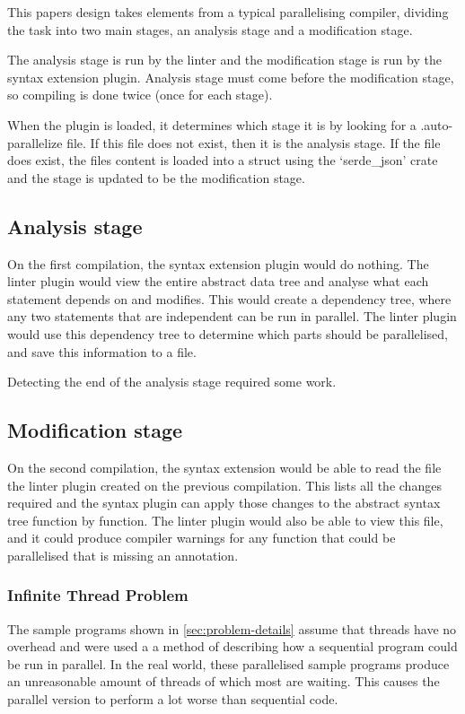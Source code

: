 \documentclass[conference]{IEEEtran}
\begin{document}
This papers design takes elements from a typical parallelising compiler, dividing the task into two main stages, an analysis stage and a modification stage.


The analysis stage is run by the linter and the modification stage is run by the syntax extension plugin. Analysis stage must come before the modification stage, so compiling is done twice (once for each stage).

When the plugin is loaded, it determines which stage it is by looking for a .auto-parallelize file. If this file does not exist, then it is the analysis stage. If the file does exist, the files content is loaded into a struct using the `serde\_json' crate and the stage is updated to be the modification stage.

\subsection{Analysis stage}
On the first compilation, the syntax extension plugin would do nothing. The linter plugin would view the entire abstract data tree and analyse what each statement depends on and modifies. This would create a dependency tree, where any two statements that are independent can be run in parallel. The linter plugin would use this dependency tree to determine which parts should be parallelised, and save this information to a file.

Detecting the end of the analysis stage required some work.

\subsection{Modification stage}
On the second compilation, the syntax extension would be able to read the file the linter plugin created on the previous compilation. This lists all the changes required and the syntax plugin can apply those changes to the abstract syntax tree function by function. The linter plugin would also be able to view this file, and it could produce compiler warnings for any function that could be parallelised that is missing an annotation.

\subsubsection{Infinite Thread Problem}
The sample programs shown in \autoref{sec:problem-details} assume that threads have no overhead and were used a a method of describing how a sequential program could be run in parallel. In the real world, these parallelised sample programs produce an unreasonable amount of threads of which most are waiting. This causes the parallel version to perform a lot worse than sequential code.
\end{document}
